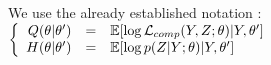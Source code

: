 \documentclass[a4paper]{article}
\renewcommand{\varobs}{Y}
\begin{document}
\begin{myText}
We use the already established notation : $\stackeq[rcl]{ Q(\theta|\theta') &=& \mbb E[\log \Lcomp(\varobs, \varlat; \theta) | \varobs,\theta'] \\ H(\theta|\theta') &=& \mbb E[\log p(\varlat|\varobs; \theta) | \varobs,\theta']}$








\end{myText}
\end{document}
